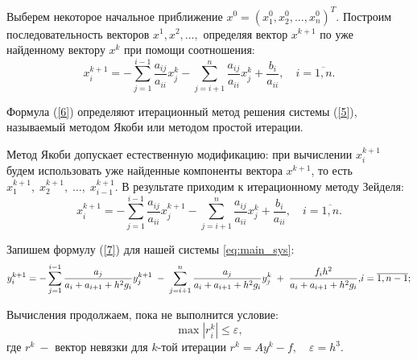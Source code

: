 \documentclass[a4paper,12pt]{article}
\begin{document}
{Выберем некоторое начальное приближение $x^0=(x_1^0, x_2^0, {\dots}, x_n^0)^T$. 
Построим последова\-тель\-ность векторов $x^1, x^2, {\dots},$ определяя вектор $x^{k+1}$ по уже найденному вектору $x^k$ при помощи соотношения: 
\begin{equation}
x_i^{k+1}= - \sum\limits_{j=1}^{i-1} \frac{a_{ij}}{a_{ii}}x_j^k - \sum\limits_{j=i+1}^n \frac{a_{ij}}{a_{ii}}x_j^k+\frac{b_i}{a_{ii}}, \quad i = \overline{1,n}. 
 \label{6}
\end{equation}

Формула (\ref{6}) определяют итерационный метод решения системы (\ref{5}), называемый мето\-дом Якоби или методом простой итерации.

Метод Якоби допускает естественную модификацию: при вычислении $x_i^{k+1}$ 
будем использовать уже найденные компоненты вектора $x^{k+1}$, то есть $x_1^{k+1},\;x_2^{k+1},\;\dots,\;x_{i-1}^{k+1}$. 
В результате приходим к итерационному методу Зейделя:
\begin{equation}
    x_i^{k+1}= - \sum\limits_{j=1}^{i-1} \frac{a_{ij}}{a_{ii}}x_j^{k+1} - \sum\limits_{j=i+1}^n \frac{a_{ij}}{a_{ii}}x_j^k+\frac{b_i}{a_{ii}}, \quad i = \overline{1,n}. 
     \label{7}
\end{equation}

Запишем формулу (\ref{7}) для нашей системы \eqref{eq:main_sys}:
\begin{equation}
    y_i^{k+1}=  -\sum\limits_{j=1}^{i-1}\frac{a_j}{a_i+a_{i+1}+h^2 g_i}y_j^{k+1} \; - \;\sum\limits_{j=i+1}^{n}\frac{a_{j}}{a_i+a_{i+1}+h^2 g_i}y_j^k\; +\; \frac{f_i h^2}{a_i+a_{i+1}+h^2 g_i},$$$$
    i=\overline{1, n-1};
     \label{8}
\end{equation}

Вычисления продолжаем, пока не выполнится условие:
$$\max\limits |r_i^k| \leq \varepsilon,$$
где $r^k ~-$ вектор невязки для $k$-той итерации $r^k=Ay^k-f, \quad \varepsilon=h^3.$

}
\end{document}
